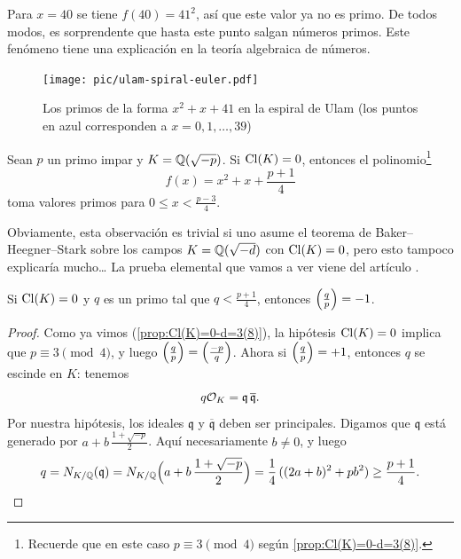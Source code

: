 Para $x = 40$ se tiene $f (40) = 41^2$, así que este valor ya no es primo.
De todos modos, es sorprendente que hasta este punto salgan números primos.
Este fenómeno tiene una explicación en la teoría algebraica de números.

\begin{figure}
  \begin{center}
    \texttt{[image: pic/ulam-spiral-euler.pdf]}
  \end{center}

  \caption{Los primos de la forma $x^2 + x + 41$ en la espiral de Ulam (los puntos en azul corresponden a $x = 0,1,\ldots,39$)}
\end{figure}

\begin{teorema}
  Sean $p$ un primo impar y $K = \mathbb{Q} (\sqrt{-p})$. Si $\operatorname{Cl} (K) = 0$, entonces
  el polinomio\footnote{Recuerde que en este caso $p \equiv 3 \pmod{4}$ según
    \ref{prop:Cl(K)=0-d=3(8)}.}
  $$f (x) = x^2 + x + \frac{p+1}{4}$$
  toma valores primos para $0 \le x < \frac{p-3}{4}$.
\end{teorema}

Obviamente, esta observación es trivial si uno asume el teorema de
Baker--Heegner--Stark sobre los campos $K = \mathbb{Q} (\sqrt{-d})$ con $\operatorname{Cl} (K) = 0$,
pero esto tampoco explicaría mucho\dots{} La prueba elemental que vamos a ver
viene del artículo \cite{Ayoub-Chowla}.

\begin{lema}
  \label{lema:Rabinowitsch-lema}
  Si $\operatorname{Cl} (K) = 0$ y $q$ es un primo tal que $q < \frac{p+1}{4}$, entonces
  $\left(\frac{q}{p}\right) = -1$.

  \begin{proof}
    Como ya vimos (\ref{prop:Cl(K)=0-d=3(8)}), la hipótesis $\operatorname{Cl} (K) = 0$
    implica que $p \equiv 3 \pmod{4}$, y luego
    $\left(\frac{q}{p}\right) = \left(\frac{-p}{q}\right)$. Ahora si $\left(\frac{q}{p}\right) = +1$,
    entonces $q$ se escinde en $K$: tenemos
    $$q \mathcal{O}_K = \mathfrak{q}\,\overline{\mathfrak{q}}.$$
    Por nuestra hipótesis, los ideales $\mathfrak{q}$ y
    $\overline{\mathfrak{q}}$ deben ser principales. Digamos que
    $\mathfrak{q}$ está generado por $a + b\,\frac{1+\sqrt{-p}}{2}$. Aquí
    necesariamente $b \ne 0$, y luego
    \[ q = N_{K/\mathbb{Q}} (\mathfrak{q}) = N_{K/\mathbb{Q}} \Bigl(a + b\,\frac{1+\sqrt{-p}}{2}\Bigr) = \frac{1}{4}\,((2a + b)^2 + pb^2) \ge \frac{p+1}{4}. \qedhere \]
  \end{proof}
\end{lema}

